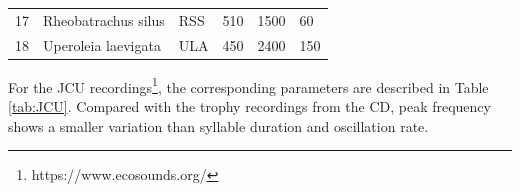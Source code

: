 \begin{table}[htb!]
{\begin{tabular}{llllll}
17        & Rheobatrachus silus           & RSS                & 510                                                                              & 1500                                                                 & 60                                                                               \\ 
18        & Uperoleia laevigata           & ULA                & 450                                                                              & 2400                                                                 & 150                                                                              \\ \hline\hline
\end{tabular}
}
\end{table}


For the JCU recordings\footnote[2]{https://www.ecosounds.org/}, the corresponding parameters are described in Table \ref{tab:JCU}. Compared with the trophy recordings from the CD, peak frequency shows a smaller variation than syllable duration and oscillation rate.


